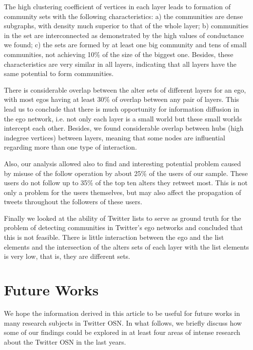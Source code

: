 The high clustering coefficient of vertices  in each layer leads to formation of community sets  with the following characteristics: a) the communities are dense subgraphs, with density much superior to that of the whole layer; b) communities in the set are interconnected as demonstrated by the high values of conductance we found; c) the sets are formed by at least one big community and tens of small communities, not achieving 10\% of the size of the biggest one. Besides, these characteristics are very similar in all layers, indicating that all layers have the same potential to form communities.

There is considerable overlap between the alter sets of different layers for an ego, with most egos having at least 30\% of overlap between any pair of layers. This lead us to conclude that there is much opportunity for information diffusion in the ego network, i.e. not only each layer is a small world but these small worlds intercept each other. Besides, we found considerable overlap between hubs (high indegree vertices) between layers, meaning that some nodes are influential regarding more than one type of interaction. 

Also, our analysis  allowed also to find and interesting potential problem caused by misuse of the follow operation by about 25\% of the users of our sample. These users do not follow up to 35\% of the top ten alters they retweet most. This is not  only a problem for the users themselves, but may also affect the propagation of tweets throughout the followers of these users.

Finally we looked at the ability of Twitter lists to serve as ground truth for the problem of detecting communities in Twitter’s ego networks and concluded that this is not feasible. There is little interaction between the ego and the list elements and the intersection of the alters sets of each layer with the list elements is very low, that is, they are different sets.


\section{Future Works}
\label{sec:future}
We hope the information derived in this article to be useful for future works in many research subjects in Twitter OSN. In what follows, we briefly discuss how some of our findings could be explored in at least four areas of intense research about the Twitter OSN in the last years. 


